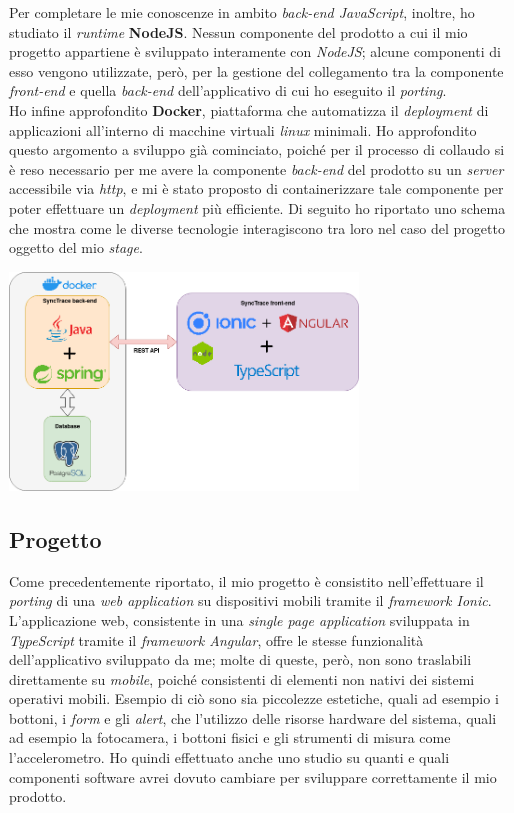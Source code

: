 Per completare le mie conoscenze in ambito \textit{back-end JavaScript}, inoltre, ho studiato il \textit{runtime} \textbf{NodeJS}. Nessun componente del prodotto a cui il mio progetto appartiene è sviluppato interamente con \textit{NodeJS}; alcune componenti di esso vengono utilizzate, però, per la gestione del collegamento tra la componente \textit{front-end} e quella \textit{back-end} dell'applicativo di cui ho eseguito il \textit{porting}. \\
Ho infine approfondito \textbf{Docker}, piattaforma che automatizza il \textit{deployment} di applicazioni all'interno di macchine virtuali \textit{linux} minimali. Ho approfondito questo argomento a sviluppo già cominciato, poiché per il processo di collaudo si è reso necessario per me avere la componente \textit{back-end} del prodotto su un \textit{server} accessibile via \textit{http}, e mi è stato proposto di containerizzare tale componente per poter effettuare un \textit{deployment} più efficiente. Di seguito ho riportato uno schema che mostra come le diverse tecnologie interagiscono tra loro nel caso del progetto oggetto del mio \textit{stage}. \\

\begin{minipage}{\linewidth}
  \centering
    \includegraphics[height=5.8cm]{immagini/tecnologie}
\end{minipage}

\subsection{Progetto}

Come precedentemente riportato, il mio progetto è consistito nell'effettuare il \textit{porting} di una \textit{web application} su dispositivi mobili tramite il \textit{framework Ionic}. L'applicazione web, consistente in una \textit{single page application} sviluppata in \textit{TypeScript} tramite il \textit{framework Angular}, offre le stesse funzionalità dell'applicativo sviluppato da me; molte di queste, però, non sono traslabili direttamente su \textit{mobile}, poiché consistenti di elementi non nativi dei sistemi operativi mobili. Esempio di ciò sono sia piccolezze estetiche, quali ad esempio i bottoni, i \textit{form} e gli \textit{alert}, che l'utilizzo delle risorse hardware del sistema, quali ad esempio la fotocamera, i bottoni fisici e gli strumenti di misura come l'accelerometro. Ho quindi effettuato anche uno studio su quanti e quali componenti software avrei dovuto cambiare per sviluppare correttamente il mio prodotto.

